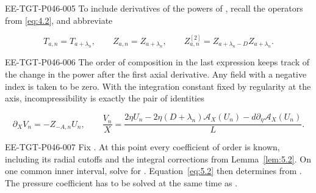 \begin{EESegment}{EE-TGT-P046-005}
To include derivatives of the powers of , recall the operators
 from \eqref{eq:4.2}, and abbreviate
\end{EESegment}
\[
T_{a,n}=T_{a+\lambda_n},
\qquad Z_{a,n}=Z_{a+\lambda_n},
\qquad Z_{a,n}^{[2]}=Z_{a+\lambda_n-D}Z_{a+\lambda_n}.
\]
\begin{EESegment}{EE-TGT-P046-006}
The order of composition in the last expression keeps track of the change in the power after the
first axial derivative. Any field with a negative index is taken to be zero. With the integration
constant fixed by regularity at the axis, incompressibility is exactly the pair of identities
\end{EESegment}
\begin{equation}
\label{eq:5.2}
\partial_XV_n=-Z_{-A,n}U_n,
\qquad
\frac{V_n}{X}
=\frac{2\eta U_n-2\eta(D+\lambda_n)\mathcal A_X(U_n)
-d\partial_\eta\mathcal A_X(U_n)}{L}.
\tag{5.2}
\end{equation}
\begin{EESegment}{EE-TGT-P046-007}
Fix . At this point every coefficient of order
 is known, including its radial cutoffs and the integral corrections from
Lemma~\ref{lem:5.2}. On one common inner interval, solve for
. Equation~\eqref{eq:5.2} then determines
 from . The pressure coefficient
 has to be solved at the same time as
.
\end{EESegment}


